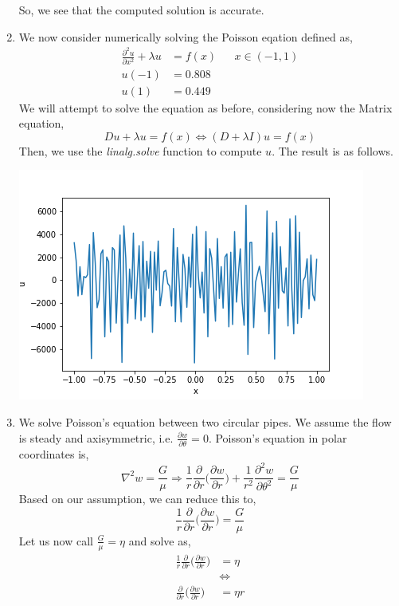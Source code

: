 \documentclass[letterpaper,10pt]{article}
\begin{document}
\begin{enumerate}
\begin{center}
\end{center}
So, we see that the computed solution is accurate.
\item We now consider numerically solving the Poisson eqation defined as,
\begin{align*}
\frac{\partial^2 u}{\partial x^2}+\lambda u &= f(x) && x\in (-1,1)\\
u(-1) &= 0.808\\
u(1) &= 0.449
\end{align*}
We will attempt to solve the equation as before, considering now the Matrix equation,
\[Du+\lambda u=f(x)\Leftrightarrow (D+\lambda I)u = f(x)\]
Then, we use the \textit{linalg.solve} function to compute $u$. The result is as follows.
\begin{center}
\includegraphics[scale=1]{5.png}
\end{center}
\item We solve Poisson's equation between two circular pipes. We assume the flow is steady and axisymmetric, i.e. $\frac{\partial w}{\partial \theta}=0$. Poisson's equation in polar coordinates is,
\[\nabla^2 w = \frac{G}{\mu} \Rightarrow \frac{1}{r}\frac{\partial}{\partial r}\bigg(\frac{\partial w}{\partial r}\bigg)+\frac{1}{r^2}\frac{\partial^2 w}{\partial \theta^2}=\frac{G}{\mu}\]
Based on our assumption, we can reduce this to,
\[\frac{1}{r}\frac{\partial}{\partial r}\bigg(\frac{\partial w}{\partial r}\bigg)=\frac{G}{\mu}\]
Let us now call $\frac{G}{\mu}=\eta$ and solve as,
\begin{align*}
\frac{1}{r}\frac{\partial}{\partial r}\bigg(\frac{\partial w}{\partial r}\bigg)&=\eta\\
&\Leftrightarrow\\
\frac{\partial}{\partial r}\bigg(\frac{\partial w}{\partial r}\bigg) &= \eta r
\end{align*}

\end{enumerate}
\end{document}
